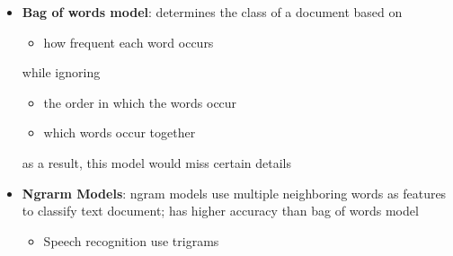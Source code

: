     \begin{itemize}
      \item \textbf{Bag of words model}: determines the class of a document
      based on
      \begin{itemize}
        \item how frequent each word occurs
      \end{itemize}
      while ignoring
      \begin{itemize}
        \item the order in which the words occur
        \item which words occur together
      \end{itemize}
      as a result, this model would miss certain details

      \item \textbf{Ngrarm Models}: ngram models use multiple neighboring words
      as features to classify text document; has higher accuracy than bag
      of words model
      \begin{itemize}
        \item Speech recognition use trigrams
      \end{itemize}
    \end{itemize}